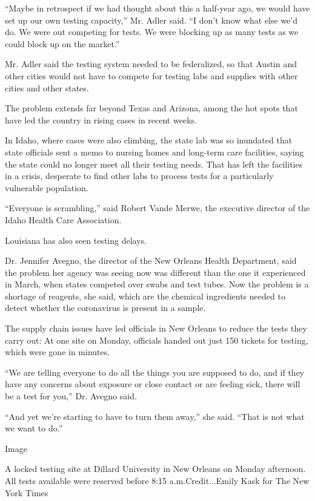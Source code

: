 ``Maybe in retrospect if we had thought about this a half-year ago, we
would have set up our own testing capacity,'' Mr. Adler said. ``I don't
know what else we'd do. We were out competing for tests. We were
blocking up as many tests as we could block up on the market.''

Mr. Adler said the testing system needed to be federalized, so that
Austin and other cities would not have to compete for testing labs and
supplies with other cities and other states.

The problem extends far beyond Texas and Arizona, among the hot spots
that have led the country in rising cases in recent weeks.

In Idaho, where cases were also climbing, the state lab was so inundated
that state officials sent a memo to nursing homes and long-term care
facilities, saying the state could no longer meet all their testing
needs. That has left the facilities in a crisis, desperate to find other
labs to process tests for a particularly vulnerable population.

``Everyone is scrambling,'' said Robert Vande Merwe, the executive
director of the Idaho Health Care Association.

Louisiana has also seen testing delays.

Dr. Jennifer Avegno, the director of the New Orleans Health Department,
said the problem her agency was seeing now was different than the one it
experienced in March, when states competed over swabs and test tubes.
Now the problem is a shortage of reagents, she said, which are the
chemical ingredients needed to detect whether the coronavirus is present
in a sample.

The supply chain issues have led officials in New Orleans to reduce the
tests they carry out: At one site on Monday, officials handed out just
150 tickets for testing, which were gone in minutes.

``We are telling everyone to do all the things you are supposed to do,
and if they have any concerns about exposure or close contact or are
feeling sick, there will be a test for you,'' Dr. Avegno said.

``And yet we're starting to have to turn them away,'' she said. ``That
is not what we want to do.''

Image

A locked testing site at Dillard University in New Orleans on Monday
afternoon. All tests available were reserved before 8:15
a.m.Credit...Emily Kask for The New York Times

